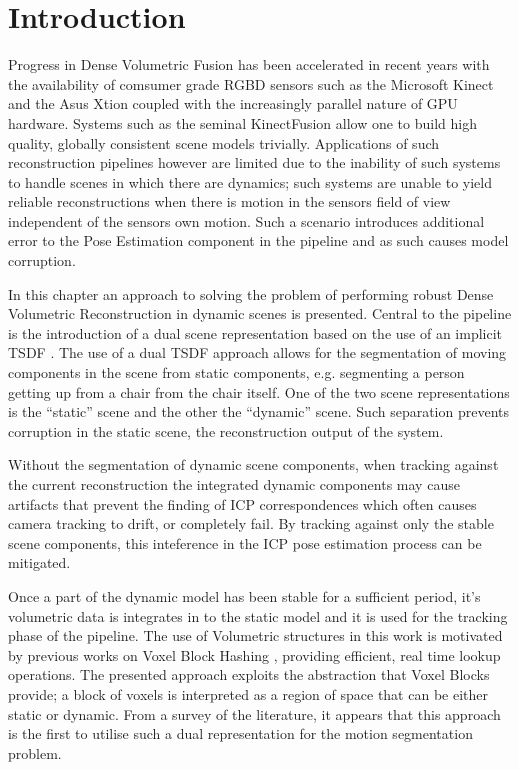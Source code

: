 
\section{Introduction}
\label{sec: moseg_introduction}
Progress in Dense Volumetric Fusion has been accelerated in recent years with
the availability of comsumer grade RGBD sensors such as the Microsoft Kinect and
the Asus Xtion coupled with the increasingly parallel nature of GPU hardware.
Systems such as the seminal KinectFusion \cite{Newcombe2011} allow one to build
high quality, globally consistent scene models trivially. Applications of such
reconstruction pipelines however are limited due to the inability of such
systems to handle scenes in which there are dynamics; such systems are unable
to yield reliable reconstructions when there is motion in the sensors field
of view independent of the sensors own motion. Such a scenario introduces
additional error to the Pose Estimation component in the pipeline and as such
causes model corruption.

In this chapter an approach to solving the problem of performing robust
Dense Volumetric Reconstruction in dynamic scenes is presented. Central to the
pipeline is the introduction of a dual scene representation based on the use
of an implicit TSDF \cite{Curless1996}. The use of a dual TSDF approach allows
for the segmentation of moving components in the scene from static components,
e.g. segmenting a person getting up from a chair from the chair itself. One of
the two scene representations is the ``static'' scene and the other the
``dynamic'' scene. Such separation prevents corruption in the static scene,
the reconstruction output of the system.

Without the segmentation of dynamic scene components, when tracking against the
current reconstruction the integrated dynamic components may cause artifacts
that prevent the finding of ICP correspondences which often causes camera
tracking to drift, or completely fail. By tracking against only the stable
scene components, this inteference in the ICP pose estimation process can be
mitigated.

Once a part of the dynamic model has been stable for a sufficient period, it's
volumetric data is integrates in to the static model and it is used for the
tracking phase of the pipeline. The use of Volumetric structures in this work
is motivated by previous works on Voxel Block Hashing \cite{NieBner2013},
providing efficient, real time lookup operations. The presented approach
exploits the abstraction that Voxel Blocks provide; a block of voxels is
interpreted as a region of space that can be either static or dynamic.
From a survey of the literature, it appears that this approach is the first to
utilise such a dual representation for the motion segmentation problem.

